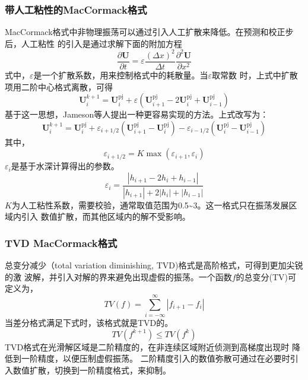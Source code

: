 \subsubsection{带人工粘性的MacCormack格式}
MacCormack格式中非物理振荡可以通过引入人工扩散来降低。在预测和校正步后，人工粘性
的引入是通过求解下面的附加方程
\begin{equation}
  \frac{\partial \mathbf{U}}{\partial t} =
  \varepsilon
  \frac{(\Delta x)^{2}}{\Delta t}
  \frac{{\partial}^{2}\mathbf{U}}{\partial x^{2}}
\end{equation}
式中，$\varepsilon$是一个扩散系数，用来控制格式中的耗散量。当$\varepsilon$取常数
时，上式中扩散项用二阶中心格式离散，可得
\begin{equation}
  \mathbf{U}_{i}^{k+1} =
  \mathbf{U}_{i}^{\mathrm{pj}} +
  \varepsilon
  (
  \mathbf{U}_{i+1}^{\mathrm{pj}} - 
  2\mathbf{U}_{i}^{\mathrm{pj}} +
  \mathbf{U}_{i-1}^{\mathrm{pj}}
  )
\end{equation}
基于这一思想，Jameson等人\cite{ref6}提出一种更容易实现的方法。上式改写为：
\begin{equation}
  \mathbf{U}_{i}^{k+1} =
  \mathbf{U}_{i}^{\mathrm{pj}} +
  {\varepsilon}_{i+1/2}
  (
  \mathbf{U}_{i+1}^{\mathrm{pj}} - 
  \mathbf{U}_{i}^{\mathrm{pj}}
  )
  -
  {\varepsilon}_{i-1/2}
  (
  \mathbf{U}_{i}^{\mathrm{pj}} -
  \mathbf{U}_{i-1}^{\mathrm{pj}}
  )
\end{equation}
其中，
\begin{equation}
  {\varepsilon}_{i+1/2} =
  K\max({\varepsilon}_{i+1},{\varepsilon}_{i})
\end{equation}
${\varepsilon}_{i}$是基于水深计算得出的参数。
\begin{equation}
  {\varepsilon}_{i} =
  \frac{|h_{i+1}-2h_{i}+h_{i-1}|}{|h_{i+1}|+2|h_{i}|+|h_{i-1}|}
\end{equation}
$K$为人工粘性系数，需要校验，通常取值范围为0.5\textasciitilde 3。这一格式只在振荡发展区域内引入
数值扩散，而其他区域内的解不受影响。

\subsubsection{TVD MacCormack格式}
总变分减少（total variation diminishing, TVD)格式是高阶格式，可得到更加尖锐的激
波解，并引入对解的界来避免出现虚假的振荡。一个函数$f$的总变分(TV)可定义为，
\begin{equation}
  TV(f) =
  \sum_{i=-\infty}^{\infty}
  |{f}_{i+1} - {f}_{i}|
\end{equation}
当差分格式满足下式时，该格式就是TVD的。
\begin{equation}
  TV({f}^{k+1}) \le TV({f}^{k})
\end{equation}
TVD格式在光滑解区域是二阶精度的，在非连续区域附近侦测到高梯度出现时
降低到一阶精度，以便压制虚假振荡。
二阶精度引入的数值弥散可通过在必要时引入数值扩散，切换到一阶精度格式，来抑制。

